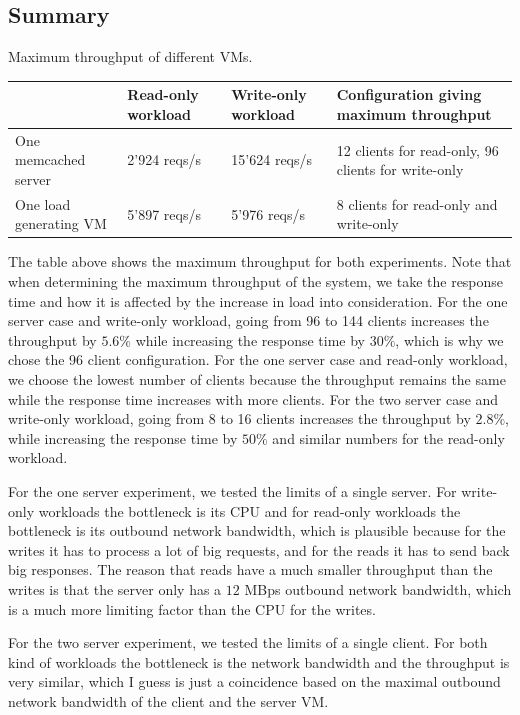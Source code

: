 \subsection{Summary}

\begin{center}
	{Maximum throughput of different VMs.}
	\begin{tabular}{|l|p{2.5cm}|p{2.5cm}|p{4cm}|}
		\hline                        & Read-only workload & Write-only workload & Configuration giving maximum throughput \\ 
		\hline One memcached server   &  2'924 reqs/s & 15'624 reqs/s & 12 clients for read-only, 96 clients for write-only        \\ 
		\hline One load generating VM & 5'897 reqs/s & 5'976 reqs/s   & 8 clients for read-only and write-only           \\ 
		\hline 
	\end{tabular}
\end{center}
The table above shows the maximum throughput for both experiments. Note that when determining the maximum throughput of the system, we take the response time and how it is affected by the increase in load into consideration. For the one server case and write-only workload, going from 96 to 144 clients increases the throughput by $5.6 \%$ while increasing the response time by $30 \%$, which is why we chose the 96 client configuration. For the one server case and read-only workload, we choose the lowest number of clients because the throughput remains the same while the response time increases with more clients. For the two server case and write-only workload, going from 8 to 16 clients increases the throughput by $2.8 \%$, while increasing the response time by $50 \%$ and similar numbers for the read-only workload. 

For the one server experiment, we tested the limits of a single server. For write-only workloads the bottleneck is its CPU and for read-only workloads the bottleneck is its outbound network bandwidth, which is plausible because for the writes it has to process a lot of big requests, and for the reads it has to send back big responses. The reason that reads have a much smaller throughput than the writes is that the server only has a $12$ MBps outbound network bandwidth, which is a much more limiting factor than the CPU for the writes. 

For the two server experiment, we tested the limits of a single client. For both kind of workloads the bottleneck is the network bandwidth and the throughput is very similar, which I guess is just a coincidence based on the maximal outbound network bandwidth of the client and the server VM. 

